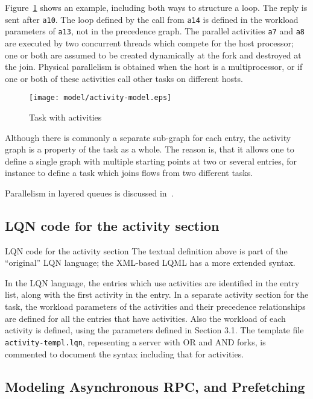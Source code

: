 \documentclass[11pt]{article}
\begin{document}
Figure~\ref{fig:activities} shows an example, including both ways to structure a loop. 
The reply is sent after \texttt{a10}. The loop defined by the call from \texttt{a14} is defined in the workload
parameters of \texttt{a13}, not in the precedence graph. The parallel activities \texttt{a7} and \texttt{a8} are executed by
two concurrent threads which compete for the host processor; one or both are assumed to be created
dynamically at the fork and destroyed at the join. Physical parallelism is obtained when the host is a
multiprocessor, or if one or both of these activities call other tasks on different hosts. 

\begin{figure}[htbp]
  \centering
  \texttt{[image: model/activity-model.eps]}
  \caption{Task with activities}
  \label{fig:activities}
\end{figure}

Although there is commonly a separate sub-graph for each entry, the activity graph is a
property of the task as a whole. The reason is, that it allows one to define a single graph with
multiple starting points at two or several entries, for instance to define a task which joins flows from
two different tasks. 

Parallelism in layered queues is discussed in~\cite{WOSP98:franks-98}.

\subsection{LQN code for the activity section}
\label{sec:activities-code}

LQN code for the activity section The textual definition above is part of the ``original'' LQN language; the XML-based LQML
has a more extended syntax.

In the LQN language, the entries which use activities are identified in the entry list, along
with the first activity in the entry. In a separate activity section for the task, the workload
parameters of the activities and their precedence relationships are defined for all the entries that
have activities. Also the workload of each activity is defined, using the parameters defined in
Section 3.1. The template file \texttt{activity-templ.lqn}, repesenting a server with OR and AND
forks, is commented to document the 
syntax including that for activities.

\subsection{Modeling Asynchronous RPC, and Prefetching}
\label{sec:asynch-rpc}
\end{document}
